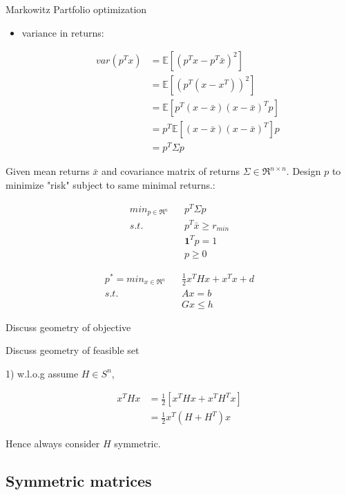 \begin{example}{Markowitz Partfolio optimization}
\begin{itemize}
		\item variance in returns:
		
		\begin{align*}
		var(p^Tx) &=\mathbb{E}[(p^Tx - p^T\bar{x})^2]\\
		&= \mathbb{E}[(p^T(x - x^T))^2]\\
		&= \mathbb{E}[p^T(x - \bar{x})(x - \bar{x})^Tp]\\
		&= p^T\mathbb{E}[(x - \bar{x})(x - \bar{x})^T]p\\
		&= p^T\Sigma p
		\end{align*}
	\end{itemize}
	
	
	
	
	
	
	
	
	

	
	Given mean returns $\bar{x}$ and covariance matrix of returns $\Sigma \in \Re^{n\times n}$. Design $p$ to minimize "risk" subject to same minimal returns.:
	
	\begin{align*}
	min_{p\in \Re^n}\,\,\,\,\, &p^T\Sigma p\\
	s.t. \,\,\,\,\,&p^T\bar{x}\geq r_{min}\\
	&\textbf{1}^Tp = 1\\
	&p\geq 0
	\end{align*}
\end{example}




\begin{align*}
p^* = min_{x\in \Re^n}\,\,\,\,\, &\frac{1}{2}x^THx + x^Tx + d\\
s.t.\,\,\,\,\, &Ax = b\\
&Gx\leq h
\end{align*}

Discuss geometry of objective

Discuss geometry of feasible set

1) w.l.o.g assume $H\in S^n$, 

\begin{align*}
x^THx &=\frac{1}{2}[x^THx + x^TH^Tx]\\
 &= \frac{1}{2}x^T(H+H^T)x
\end{align*}

Hence always consider $H$ symmetric.\\



\subsection{Symmetric matrices}


